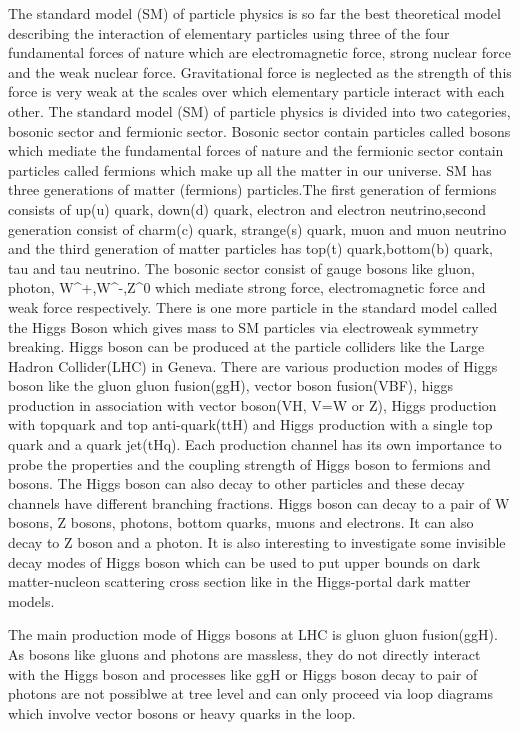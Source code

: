\documentclass[final,3p]{CSP}
\begin{document}
The standard model (SM) of particle physics is so far the best theoretical model describing the interaction of elementary 
particles using three of the four fundamental forces of nature which are electromagnetic force, strong nuclear force and the weak
nuclear force. Gravitational force is neglected as the strength of this force is very weak at the scales over which elementary 
particle interact with each other. The standard model (SM) of particle physics is divided into two categories, bosonic sector 
and fermionic sector. Bosonic sector contain particles called bosons which mediate the fundamental forces of nature and the
fermionic sector contain particles called fermions which make up all the matter in our universe. SM has three generations of 
matter (fermions) particles.The first generation of fermions consists of up(u) quark, down(d) quark, electron and electron neutrino,second generation consist of charm(c) quark, strange(s) quark, muon and muon neutrino and the third generation of matter 
particles has top(t) quark,bottom(b) quark, tau and tau neutrino. The bosonic sector consist of gauge bosons like gluon, photon, 
W^+,W^-,Z^0 which mediate strong force, electromagnetic force and weak force respectively. There is one more particle in the 
standard model called the Higgs Boson which gives mass to SM particles via electroweak symmetry breaking. Higgs boson can be 
produced at the particle colliders like the Large Hadron Collider(LHC) in Geneva. There are various production modes of Higgs 
boson like the gluon gluon  fusion(ggH), vector boson fusion(VBF), higgs production in association with vector boson(VH, V=W or 
Z), Higgs production with topquark and top anti-quark(ttH) and Higgs production with a single top quark and a quark jet(tHq). 
Each production channel has its own importance to probe the properties and the coupling strength of Higgs boson to fermions and 
bosons. The Higgs boson can also decay to other particles and these decay channels have different branching fractions. Higgs 
boson can decay to a pair of W bosons, Z bosons, photons, bottom quarks, muons and electrons. It can also decay to Z boson and a 
photon. It is also interesting to investigate some invisible decay modes of Higgs boson which can be used to put upper bounds on 
dark matter-nucleon scattering cross section like in the Higgs-portal dark matter models.

The main production mode of Higgs bosons at LHC is gluon gluon fusion(ggH). As bosons like gluons and photons are massless, they 
do not directly interact with the Higgs boson and processes like ggH or Higgs boson decay to pair of photons are not possiblwe at 
tree level and can only proceed via loop diagrams which involve vector bosons or heavy quarks in the loop.
\end{document}
